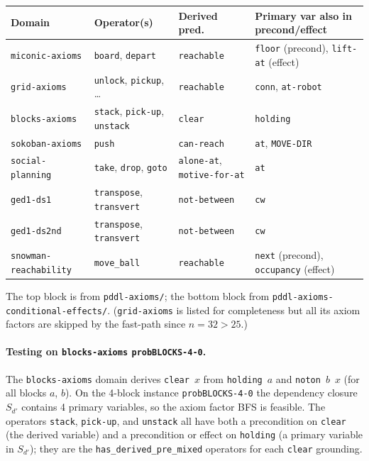 \documentclass[11pt,a4paper]{article}
\begin{document}
\begin{itemize}
    \begin{center}
    \begin{tabular}{llll}
    \toprule
    \textbf{Domain} & \textbf{Operator(s)} & \textbf{Derived pred.}
      & \textbf{Primary var also in precond/effect} \\
    \midrule
    \texttt{miconic-axioms}       & \texttt{board}, \texttt{depart}
      & \texttt{reachable} & \texttt{floor} (precond), \texttt{lift-at} (effect) \\
    \texttt{grid-axioms}          & \texttt{unlock}, \texttt{pickup}, \ldots
      & \texttt{reachable} & \texttt{conn}, \texttt{at-robot} \\
    \texttt{blocks-axioms}        & \texttt{stack}, \texttt{pick-up}, \texttt{unstack}
      & \texttt{clear}     & \texttt{holding} \\
    \texttt{sokoban-axioms}       & \texttt{push}
      & \texttt{can-reach} & \texttt{at}, \texttt{MOVE-DIR} \\
    \texttt{social-planning}      & \texttt{take}, \texttt{drop}, \texttt{goto}
      & \texttt{alone-at}, \texttt{motive-for-at} & \texttt{at} \\
    \midrule
    \texttt{ged1-ds1}             & \texttt{transpose}, \texttt{transvert}
      & \texttt{not-between} & \texttt{cw} \\
    \texttt{ged1-ds2nd}           & \texttt{transpose}, \texttt{transvert}
      & \texttt{not-between} & \texttt{cw} \\
    \texttt{snowman-reachability} & \texttt{move\_ball}
      & \texttt{reachable} & \texttt{next} (precond), \texttt{occupancy} (effect) \\
    \bottomrule
    \end{tabular}
    \end{center}

    \noindent The top block is from \texttt{pddl-axioms/}; the bottom block
    from \texttt{pddl-axioms-conditional-effects/}.
    (\texttt{grid-axioms} is listed for completeness but all its axiom factors
    are skipped by the fast-path since $n = 32 > 25$.)

    \paragraph{Testing on \texttt{blocks-axioms} \texttt{probBLOCKS-4-0}.}

    The \texttt{blocks-axioms} domain derives \texttt{clear}~$x$ from
    \texttt{holding}~$a$ and \texttt{noton}~$b$~$x$ (for all blocks $a$, $b$).
    On the 4-block instance \texttt{probBLOCKS-4-0} the dependency closure
    $S_{d'}$ contains 4 primary variables, so the axiom factor BFS is feasible.
    The operators \texttt{stack}, \texttt{pick-up}, and \texttt{unstack} all
    have both a precondition on \texttt{clear} (the derived variable) and a
    precondition or effect on \texttt{holding} (a primary variable in $S_{d'}$);
    they are the \texttt{has\_derived\_pre\_mixed} operators for each
    \texttt{clear} grounding.


\end{itemize}
\end{document}
